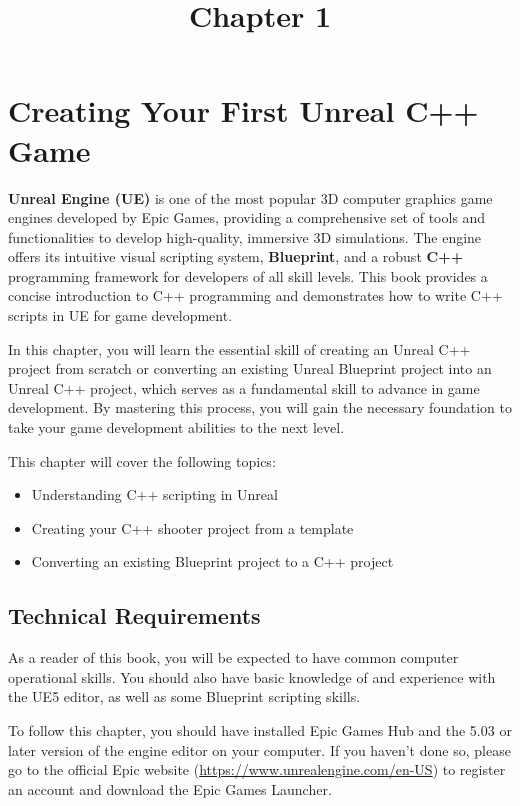 \documentclass[11pt]{article} %
\title{Chapter 1}
\date{} %
\begin{document}
\maketitle

\section*{Creating Your First Unreal C++ Game}

\textbf{Unreal Engine (UE)} is one of the most popular 3D computer graphics game engines developed by Epic Games, providing a comprehensive set of tools and functionalities to develop high-quality, immersive 3D simulations. The engine offers its intuitive visual scripting system, \textbf{Blueprint}, and a robust \textbf{C++} programming framework for developers of all skill levels. This book provides a concise introduction to C++ programming and demonstrates how to write C++ scripts in UE for game development.

In this chapter, you will learn the essential skill of creating an Unreal C++ project from scratch or converting an existing Unreal Blueprint project into an Unreal C++ project, which serves as a fundamental skill to advance in game development. By mastering this process, you will gain the necessary foundation to take your game development abilities to the next level.


This chapter will cover the following topics:

\begin{itemize}
	\item Understanding C++ scripting in Unreal
	\item Creating your C++ shooter project from a template
	\item Converting an existing Blueprint project to a C++ project
\end{itemize}

\subsection*{Technical Requirements}

As a reader of this book, you will be expected to have common computer operational skills. You should also have basic knowledge of and experience with the UE5 editor, as well as some Blueprint scripting skills.

To follow this chapter, you should have installed Epic Games Hub and the 5.03 or later version of the engine editor on your computer. If you haven’t done so, please go to the official Epic website (\url{https://www.unrealengine.com/en-US}) to register an account and download the Epic Games Launcher.
\end{document}
